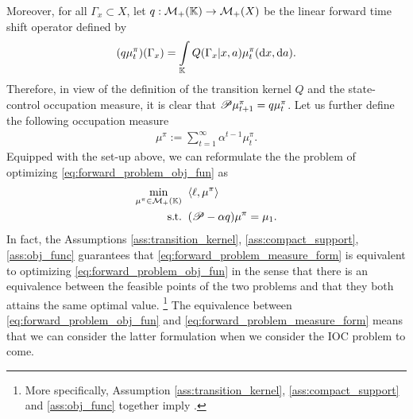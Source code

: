 Moreover, for all $\Gamma_x\subset X$, let $q:\mathcal{M}_+(\mathbb{K})\rightarrow\mathcal{M}_+(X)$ be the linear forward time shift operator defined by
\begin{align*}
  (q\mu_t^\pi)(\Gamma_x) = \int_{\mK} Q(\Gamma_x|x,a)\mu_t^\pi(\mathrm d x,\mathrm d a).
\end{align*}
Therefore, in view of the definition of the transition kernel $Q$ and the state-control occupation measure, it is clear that $\mathscr{P}\mu_{t+1}^\pi = q\mu_t^\pi$. Let us further define the following occupation measure
\begin{align}\label{eq:mu^pi_def}
  \mu^\pi:=\sum_{t=1}^\infty \alpha^{t-1} \mu_t^\pi.
\end{align}
Equipped with the set-up above, we can reformulate the the problem of optimizing \eqref{eq:forward_problem_obj_fun} as
\begin{subequations}\label{eq:forward_problem_measure_form}
\begin{align}
  \min_{\mu^\pi\in\mathcal{M}_+(\mathbb{K})} &\;\;\langle \relax{\ell},\mu^\pi\rangle \label{eq:forward_problem_measure_form_obj}\\
  \operatorname*{s.\hspace{-2pt}t.} &\;\;(\mathscr{P}-\alpha q)\mu^\pi = \mu_1.\label{eq:forward_problem_measure_form_dynamics}
\end{align}
\end{subequations}
In fact, the Assumptions \ref{ass:transition_kernel}, \ref{ass:compact_support}, \ref{ass:obj_func} guarantees that \eqref{eq:forward_problem_measure_form} is equivalent to optimizing \eqref{eq:forward_problem_obj_fun} \citep[Thm.~6.3.7]{hernandez2012discrete} in the sense that there is an equivalence between the feasible points of the two problems and that they both attains the same optimal value.
\footnote{More specifically, Assumption \ref{ass:transition_kernel}, \ref{ass:compact_support} and \ref{ass:obj_func} together imply \citep[Ass.~4.2.1]{hernandez2012discrete}.}
The equivalence between \eqref{eq:forward_problem_obj_fun} and \eqref{eq:forward_problem_measure_form} means that we can consider the latter formulation when we consider the IOC problem to come. 

